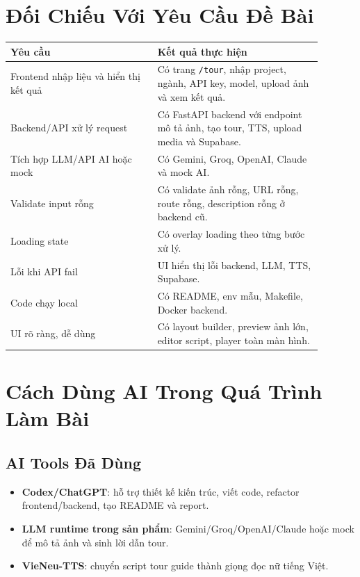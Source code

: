 \documentclass[12pt,a4paper]{article}
\begin{document}
\section{Đối Chiếu Với Yêu Cầu Đề Bài}

\begin{longtable}{p{0.42\linewidth} p{0.47\linewidth}}
\toprule
\textbf{Yêu cầu} & \textbf{Kết quả thực hiện} \\
\midrule
Frontend nhập liệu và hiển thị kết quả & Có trang \texttt{/tour}, nhập project, ngành, API key, model, upload ảnh và xem kết quả. \\
Backend/API xử lý request & Có FastAPI backend với endpoint mô tả ảnh, tạo tour, TTS, upload media và Supabase. \\
Tích hợp LLM/API AI hoặc mock & Có Gemini, Groq, OpenAI, Claude và mock AI. \\
Validate input rỗng & Có validate ảnh rỗng, URL rỗng, route rỗng, description rỗng ở backend cũ. \\
Loading state & Có overlay loading theo từng bước xử lý. \\
Lỗi khi API fail & UI hiển thị lỗi backend, LLM, TTS, Supabase. \\
Code chạy local & Có README, env mẫu, Makefile, Docker backend. \\
UI rõ ràng, dễ dùng & Có layout builder, preview ảnh lớn, editor script, player toàn màn hình. \\
\bottomrule
\end{longtable}

\section{Cách Dùng AI Trong Quá Trình Làm Bài}

\subsection{AI Tools Đã Dùng}

\begin{itemize}
  \item \textbf{Codex/ChatGPT}: hỗ trợ thiết kế kiến trúc, viết code, refactor frontend/backend, tạo README và report.
  \item \textbf{LLM runtime trong sản phẩm}: Gemini/Groq/OpenAI/Claude hoặc mock để mô tả ảnh và sinh lời dẫn tour.
  \item \textbf{VieNeu-TTS}: chuyển script tour guide thành giọng đọc nữ tiếng Việt.
\end{itemize}
\end{document}
